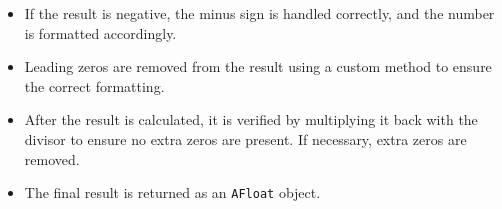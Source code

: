 \documentclass{article}
\begin{document}
\begin{itemize}
        \begin{itemize}
            \item The quotient and the decimal part are concatenated.
            \item If there are extra zeros, they are added or removed as necessary, and the decimal point is inserted in the correct position.
        \end{itemize}
    \item If the result is negative, the minus sign is handled correctly, and the number is formatted accordingly.
    \item Leading zeros are removed from the result using a custom method to ensure the correct formatting.
    \item After the result is calculated, it is verified by multiplying it back with the divisor to ensure no extra zeros are present. If necessary, extra zeros are removed.
    \item The final result is returned as an \texttt{AFloat} object.
\end{itemize}
\end{document}
